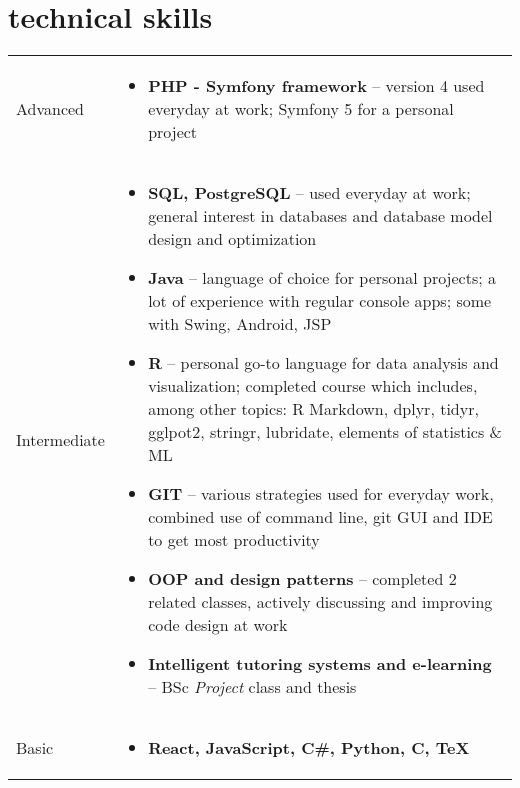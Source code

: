 \documentclass[a4paper]{article}
\makeatletter
\newlength{\tablewidth}
\newenvironment{skills}{%
\setlength{\tablewidth}{\linewidth}
\addtolength{\tablewidth}{-2\tabcolsep}
\begin{tabular}{@{}p{0.15\tablewidth}p{0.85\tablewidth}@{}}
}{%
\end{tabular}
}
\makeatother
\begin{document}
\section{technical skills}
\begin{skills}
    Advanced &
    \begin{itemize}
        \item \textbf{PHP - Symfony framework} -- version 4 used everyday at work; Symfony 5 for a personal project    
    \end{itemize} \\
    Intermediate &
    \begin{itemize}
        \item \textbf{SQL, PostgreSQL} -- used everyday at work; general interest in databases and database model design and optimization
        \item \textbf{Java} -- language of choice for personal projects; a lot of experience with regular console apps; some with Swing, Android, JSP
        \item \textbf{R} -- personal go-to language for data analysis and visualization; completed course which includes, among other topics:
        \newline
        R Markdown, dplyr, tidyr, gglpot2, stringr, lubridate, elements of statistics \& ML
        \item \textbf{GIT} --  various strategies used for everyday work, combined use of command line, git GUI and IDE to get most productivity
        \item \textbf{OOP and design patterns} -- completed 2 related classes, actively discussing and improving code design at work
        \item \textbf{Intelligent tutoring systems and e-learning} -- BSc \textit{Project} class and thesis
    \end{itemize}\\
    Basic &
    \begin{itemize}
        \item \textbf{React, JavaScript, C\#, Python, C, TeX}
    \end{itemize} \\
\end{skills}

\end{document}
